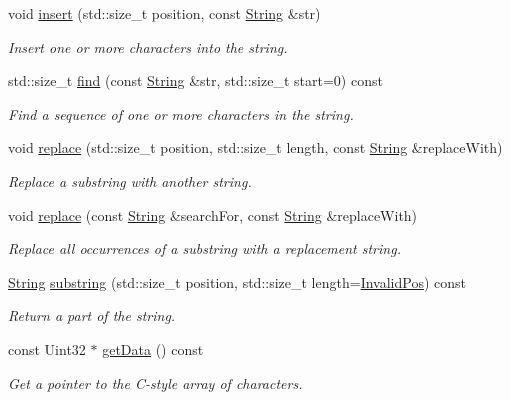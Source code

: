 \begin{DoxyCompactItemize}
void \mbox{\hyperlink{classsf_1_1_string_ad0b1455deabf07af13ee79812e05fa02}{insert}} (std\+::size\+\_\+t position, const \mbox{\hyperlink{classsf_1_1_string}{String}} \&str)
\begin{DoxyCompactList}\small\item\em Insert one or more characters into the string. \end{DoxyCompactList}\item 
std\+::size\+\_\+t \mbox{\hyperlink{classsf_1_1_string_aa189ec8656854106ab8d2e935fd9cbcc}{find}} (const \mbox{\hyperlink{classsf_1_1_string}{String}} \&str, std\+::size\+\_\+t start=0) const
\begin{DoxyCompactList}\small\item\em Find a sequence of one or more characters in the string. \end{DoxyCompactList}\item 
void \mbox{\hyperlink{classsf_1_1_string_ad460e628c287b0fa88deba2eb0b6744b}{replace}} (std\+::size\+\_\+t position, std\+::size\+\_\+t length, const \mbox{\hyperlink{classsf_1_1_string}{String}} \&replace\+With)
\begin{DoxyCompactList}\small\item\em Replace a substring with another string. \end{DoxyCompactList}\item 
void \mbox{\hyperlink{classsf_1_1_string_a82bbfee2bf23c641e5361ad505c07921}{replace}} (const \mbox{\hyperlink{classsf_1_1_string}{String}} \&search\+For, const \mbox{\hyperlink{classsf_1_1_string}{String}} \&replace\+With)
\begin{DoxyCompactList}\small\item\em Replace all occurrences of a substring with a replacement string. \end{DoxyCompactList}\item 
\mbox{\hyperlink{classsf_1_1_string}{String}} \mbox{\hyperlink{classsf_1_1_string_a492645e00032455e6d92ff0e992654ce}{substring}} (std\+::size\+\_\+t position, std\+::size\+\_\+t length=\mbox{\hyperlink{classsf_1_1_string_abaadecaf12a6b41c54d725c75fd28527}{Invalid\+Pos}}) const
\begin{DoxyCompactList}\small\item\em Return a part of the string. \end{DoxyCompactList}\item 
const Uint32 $\ast$ \mbox{\hyperlink{classsf_1_1_string_a0b38001f1a6b7bdf35bb180da5391929}{get\+Data}} () const
\begin{DoxyCompactList}\small\item\em Get a pointer to the C-\/style array of characters. \end{DoxyCompactList}\item 

\end{DoxyCompactItemize}
